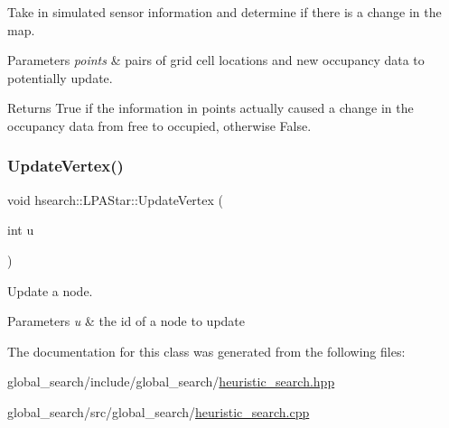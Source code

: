 Take in simulated sensor information and determine if there is a change in the map. 


\begin{DoxyParams}{Parameters}
{\em points} & pairs of grid cell locations and new occupancy data to potentially update. \\
\hline
\end{DoxyParams}
\begin{DoxyReturn}{Returns}
True if the information in points actually caused a change in the occupancy data from free to occupied, otherwise False. 
\end{DoxyReturn}
\mbox{\label{classhsearch_1_1LPAStar_a41219de9a23ffe245589dc34a35e0639}} 
\subsubsection{\texorpdfstring{Update\+Vertex()}{UpdateVertex()}}
{\footnotesize\ttfamily void hsearch\+::\+L\+P\+A\+Star\+::\+Update\+Vertex (\begin{DoxyParamCaption}\item[{int}]{u }\end{DoxyParamCaption})\hspace{0.3cm}{\ttfamily [protected]}}



Update a node. 


\begin{DoxyParams}{Parameters}
{\em u} & the id of a node to update \\
\hline
\end{DoxyParams}


The documentation for this class was generated from the following files\+:\begin{DoxyCompactItemize}
\item 
global\+\_\+search/include/global\+\_\+search/\hyperlink{heuristic__search_8hpp}{heuristic\+\_\+search.\+hpp}\item 
global\+\_\+search/src/global\+\_\+search/\hyperlink{heuristic__search_8cpp}{heuristic\+\_\+search.\+cpp}\end{DoxyCompactItemize}
